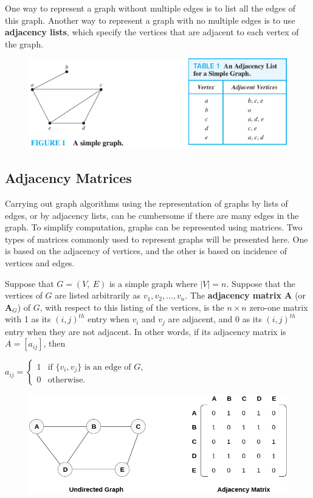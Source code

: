 \documentclass[11pt]{article}
\begin{document}
One way to represent a graph without multiple edges is to list all the edges of this graph. Another way to represent a graph with no multiple edges is to use \textbf{adjacency lists}, which specify the vertices that are adjacent to each vertex of the graph.

\begin{figure}[h!]
    \centering
    \includegraphics[width=.7\textwidth]{img/ch10.3-figure1.png}
    \label{fig:my_label}
\end{figure}

\subsection{Adjacency Matrices}

Carrying out graph algorithms using the representation of graphs by lists of edges, or by adjacency lists, can be cumbersome if there are many edges in the graph. To simplify computation, graphs can be represented using matrices. Two types of matrices commonly used to represent graphs will be presented here. One is based on the adjacency of vertices, and the other is based on incidence of vertices and edges.

Suppose that $G = (V,\ E)$ is a simple graph where $|V| = n$. Suppose that the vertices of $G$ are listed arbitrarily as $v_1, v_2, ..., v_n$. The \textbf{adjacency matrix $\mathbf{A}$} (or $\mathbf{A}_G$) of $G$, with respect to this listing of the vertices, is the $n \times n$ zero-one matrix with 1 as its $(i, j)^{th}$ entry when $v_i$ and $v_j$ are adjacent, and 0 as its $(i, j)^{th}$ entry when they are not adjacent. In other words, if its adjacency
matrix is $A = [a_{ij}]$, then

$a_{ij} = 
    \begin{cases}
        1& \text{if $\{v_i, v_j\}$ is an edge of $G$},\\
        0& \text{otherwise}.
    \end{cases}$

\begin{figure}[h!]
    \centering
    \includegraphics[width=.8\textwidth]{img/ch10.3-adjaceny_matrix.png}
    \label{fig:my_label}
\end{figure}
\end{document}
